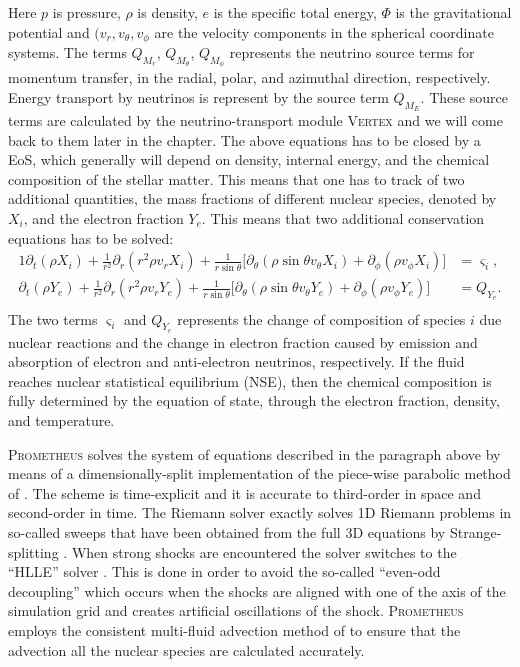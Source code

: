 Here $p$ is pressure, $\rho$ is density, $e$ is the specific total energy,  $\Phi$ is the gravitational potential and
$(v_r,v_{\theta}, v_{\phi}$ are the velocity components in the spherical
coordinate systems. The terms $Q_{M_{r}}$, $Q_{M_{\theta}}$, $Q_{M_{\phi}}$ represents
the neutrino source terms for momentum transfer, in the radial, polar, and azimuthal direction, respectively.
Energy transport by neutrinos is represent by the source term $Q_{M_{E}}$. These source terms are calculated
by the neutrino-transport module \textsc{Vertex} and we will come back to them later in the chapter.
The above equations has to be closed by a EoS, which generally will depend on 
density, internal energy, and the chemical composition of the stellar matter.
This means that one has to track of two additional quantities, the mass fractions
of different nuclear species, denoted by $X_i$, and the electron fraction $Y_e$. This means
that two additional conservation equations has to be solved:
\begin{alignat}{1}
\partial_t (\rho X_i) + \frac{1}{r^2} \partial_r (r^2 \rho v_r X_i) + \frac{1}{r \sin{\theta}} \bigg[ \partial_{\theta} (\rho \sin{\theta} v_{\theta} X_i) + \partial_{\phi} (\rho v_{\phi} X_i) \bigg] &= \varsigma_i, \label{eqN:contxi} \\
\partial_t (\rho Y_e) + \frac{1}{r^2} \partial_r (r^2 \rho v_r Y_e) + \frac{1}{r \sin{\theta}} \bigg[ \partial_{\theta} (\rho \sin{\theta} v_{\theta} Y_e) + \partial_{\phi} (\rho v_{\phi} Y_e) \bigg] &= Q_{Y_e}. \label{eqN:contye} \\
\end{alignat}
The two terms $\varsigma_i$ and $Q_{Y_e}$ represents the change of composition of species $i$ due nuclear reactions
and the change in electron fraction caused by emission and absorption of electron and anti-electron neutrinos,
respectively. If the fluid reaches nuclear statistical equilibrium (NSE), then the chemical 
composition is fully determined by the equation of state, through the electron fraction, density, and
temperature.

\textsc{Prometheus} solves the system of equations described in the paragraph above
by means of a dimensionally-split implementation of the piece-wise parabolic method of \cite{colella_84}.
The scheme is time-explicit and it is accurate to third-order in space and second-order in time.
The Riemann solver exactly solves 1D Riemann problems in so-called sweeps
that have been obtained from the full 3D equations by Strange-splitting \citep{strang_68}.
When strong shocks are encountered the solver switches to the ``HLLE'' solver \citep{einfeldt_88}.
This is done in order to avoid the so-called ``even-odd decoupling'' which occurs
when the shocks are aligned with one of the axis of the simulation grid \citep{quirk_94,kifonidis_03}
and creates artificial oscillations of the shock. \textsc{Prometheus} employs the 
consistent multi-fluid advection method of \cite{plewa_99} to ensure that the advection all the nuclear species
are calculated accurately.

